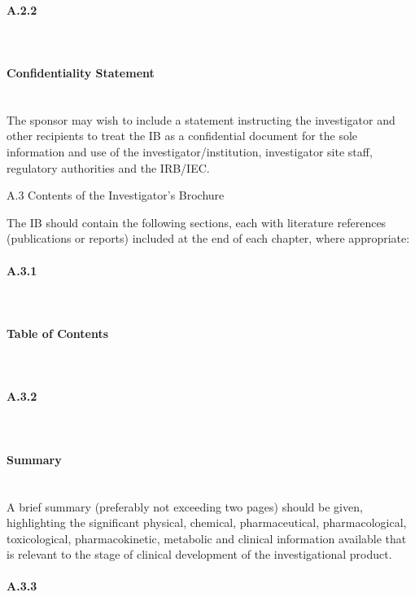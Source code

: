 \documentclass[11pt]{article}
\begin{document}
\paragraph{A.2.2}\mbox{}\\

\paragraph{Confidentiality Statement}\mbox{}\\

The sponsor may wish to include a statement instructing the investigator and other recipients to treat the IB as a confidential document for the sole information and use of the investigator/institution, investigator site staff, regulatory authorities and the IRB/IEC.


A.3 Contents of the Investigator's Brochure


The IB should contain the following sections, each with literature references (publications or reports) included at the end of each chapter, where appropriate:


\paragraph{A.3.1}\mbox{}\\

\paragraph{Table of Contents}\mbox{}\\

\paragraph{A.3.2}\mbox{}\\

\paragraph{Summary}\mbox{}\\

A brief summary (preferably not exceeding two pages) should be given, highlighting the significant physical, chemical, pharmaceutical, pharmacological, toxicological, pharmacokinetic, metabolic and clinical information available that is relevant to the stage of clinical development of the investigational product.


\paragraph{A.3.3}\mbox{}\\
\end{document}

